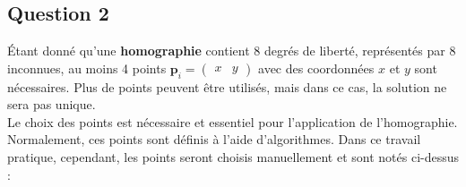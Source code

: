 \documentclass[../5RO17_TP1.tex]{subfiles}
\begin{document}
\subsection{Question 2}
\noindent Étant donné qu'une \textbf{homographie} contient 8 degrés de liberté, représentés par 8 inconnues, au moins 4 points $\mathbf{p}_{i} = \begin{pmatrix} x & y \end{pmatrix}$ avec des coordonnées $x$ et $y$ sont nécessaires. Plus de points peuvent être utilisés, mais dans ce cas, la solution ne sera pas unique.\\

\noindent Le choix des points est nécessaire et essentiel pour l'application de l'homographie. Normalement, ces points sont définis à l'aide d'algorithmes. Dans ce travail pratique, cependant, les points seront choisis manuellement et sont notés ci-dessus :
\end{document}
